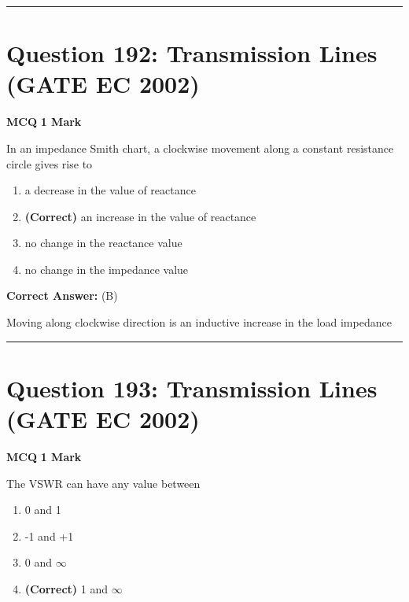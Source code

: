 \documentclass[11pt,a4paper]{article}
\begin{document}
\vspace{1.5em}
\hrule
\vspace{1.5em}

\section*{Question 192: Transmission Lines (GATE EC 2002)}
\noindent \textbf{\color{primary}MCQ} \hfill \textbf{\color{secondary}1 Mark}


\noindent In an impedance Smith chart, a clockwise movement along a constant resistance
circle gives rise to


\begin{enumerate}[label=(\Alph*)]
    \item a decrease in the value of reactance
    \item \textbf{(Correct)} an increase in the value of reactance
    \item no change in the reactance value
    \item no change in the impedance value
\end{enumerate}

\noindent \textbf{Correct Answer:} (B)

\begin{tcolorbox}[solbox, title=Detailed Solution -- Question 192]
Moving along clockwise direction is an inductive
increase in the load impedance
\end{tcolorbox}

\vspace{1.5em}
\hrule
\vspace{1.5em}

\section*{Question 193: Transmission Lines (GATE EC 2002)}
\noindent \textbf{\color{primary}MCQ} \hfill \textbf{\color{secondary}1 Mark}


\noindent The VSWR can have any value between


\begin{enumerate}[label=(\Alph*)]
    \item 0 and 1
    \item -1 and +1
    \item 0 and $\infty$
    \item \textbf{(Correct)} 1 and $\infty$
\end{enumerate}
\end{document}
